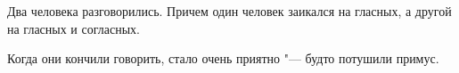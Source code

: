 Два человека разговорились. 
Причем один человек заикался на гласных, а другой на гласных и согласных.

Когда они кончили говорить, стало очень
приятно "--- будто потушили примус.
